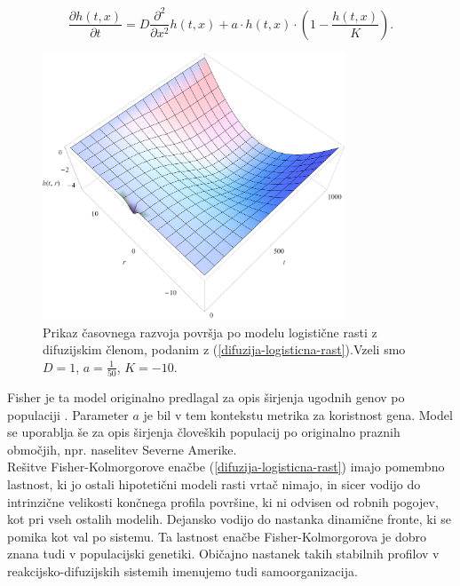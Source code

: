 \documentclass[a4paper, twoside, 12pt]{book}
\begin{document}
    \begin{equation}
      \frac{ \partial h(t,x) }{ \partial t} = D \frac{\partial^2}{\partial x^2} h(t,x) + a \cdot h(t,x) \cdot (1 - \frac{h(t,x)}{K}).
      \label{difuzija-logisticna-rast}
    \end{equation}
    \begin{figure}[h!]
      \begin{center}
        \includegraphics[width=9cm]{slike/difuzija-logisticna-rast2}
      \end{center}
      \caption{Prikaz časovnega razvoja površja po modelu logistične rasti z difuzijskim členom, podanim z (\ref{difuzija-logisticna-rast}).Vzeli smo $D=1$, $a=\frac{1}{50}$, $K=-10$.}
      \label{fig:difuzija-logisticna-rast}
    \end{figure}

Fisher je ta model originalno predlagal za opis širjenja ugodnih genov po populaciji \cite{broadbridge2002huxley}. Parameter $a$ je bil v tem kontekstu metrika za koristnost gena. Model se uporablja še za opis širjenja človeških populacij po originalno praznih območjih, npr. naselitev Severne Amerike.\\

Rešitve Fisher-Kolmorgorove enačbe (\ref{difuzija-logisticna-rast}) imajo pomembno lastnost, ki jo ostali hipotetični modeli rasti vrtač nimajo, in sicer vodijo do intrinzične velikosti končnega profila površine, ki ni odvisen od robnih pogojev, kot pri vseh ostalih modelih. Dejansko vodijo do nastanka dinamične fronte, ki se pomika kot val po sistemu. Ta lastnost enačbe Fisher-Kolmorgorova je dobro znana tudi v populacijski genetiki. Običajno nastanek takih stabilnih profilov v reakcijsko-difuzijskih sistemih imenujemo tudi samoorganizacija.
\end{document}
